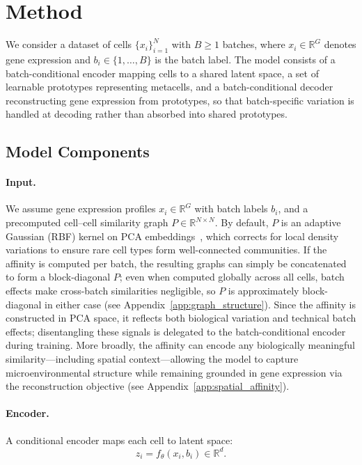 \section{Method}

We consider a dataset of cells $\{x_i\}_{i=1}^N$ with $B \geq 1$ batches, where $x_i \in \mathbb{R}^G$ denotes gene expression and $b_i \in \{1, \dots, B\}$ is the batch label. The model consists of a batch-conditional encoder mapping cells to a shared latent space, a set of learnable prototypes representing metacells, and a batch-conditional decoder reconstructing gene expression from prototypes, so that batch-specific variation is handled at decoding rather than absorbed into shared prototypes.

\subsection{Model Components}

\paragraph{Input.}
We assume gene expression profiles $x_i \in \mathbb{R}^G$ with batch labels $b_i$, and a precomputed cell--cell similarity graph $P \in \mathbb{R}^{N \times N}$. By default, $P$ is an adaptive Gaussian (RBF) kernel on PCA embeddings~\citep{seacells}, which corrects for local density variations to ensure rare cell types form well-connected communities.
If the affinity is computed per batch, the resulting graphs can simply be concatenated to form a block-diagonal $P$; even when computed globally across all cells, batch effects make cross-batch similarities negligible, so $P$ is approximately block-diagonal in either case (see Appendix~\ref{app:graph_structure}).
Since the affinity is constructed in PCA space, it reflects both biological variation and technical batch effects; disentangling these signals is delegated to the batch-conditional encoder during training.
More broadly, the affinity can encode any biologically meaningful similarity---including spatial context---allowing the model to capture microenvironmental structure while remaining grounded in gene expression via the reconstruction objective (see Appendix~\ref{app:spatial_affinity}).

\paragraph{Encoder.}
A conditional encoder maps each cell to latent space:
\[
z_i = f_\theta(x_i, b_i) \in \mathbb{R}^d.
\]

